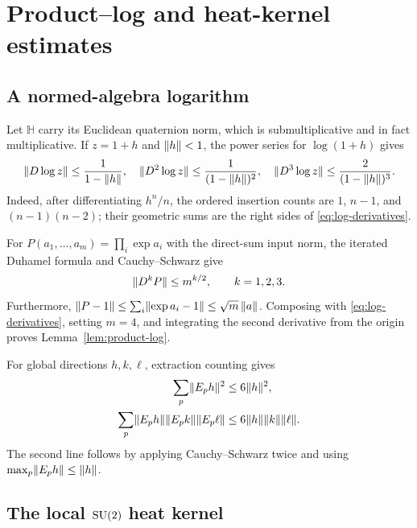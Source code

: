 \section{Product--log and heat-kernel estimates}\label{app:heat-kernel}

\subsection{A normed-algebra logarithm}

Let $\mathbb H$ carry its Euclidean quaternion norm, which is
submultiplicative and in fact multiplicative.  If $z=1+h$ and $\lVert h\rVert<1$,
the power series for $\log(1+h)$ gives
\begin{equation}\label{eq:log-derivatives}
 \lVert D\log z\rVert\le\frac1{1-\lVert h\rVert},\quad
 \lVert D^2\log z\rVert\le\frac1{(1-\lVert h\rVert)^2},\quad
 \lVert D^3\log z\rVert\le\frac2{(1-\lVert h\rVert)^3}.
\end{equation}
Indeed, after differentiating $h^n/n$, the ordered insertion counts are
$1$, $n-1$, and $(n-1)(n-2)$; their geometric sums are the right sides of
\eqref{eq:log-derivatives}.

For $P(a_1,\ldots,a_m)=\prod_i\exp a_i$ with the direct-sum input norm,
the iterated Duhamel formula and Cauchy--Schwarz give
\[
 \lVert D^kP\rVert\le m^{k/2},\qquad k=1,2,3.
\]
Furthermore,
$\lVert P-1\rVert\le\sum_i\lVert \exp a_i-1\rVert\le\sqrt m\,\lVert a\rVert$.
Composing with \eqref{eq:log-derivatives}, setting $m=4$, and integrating the
second derivative from the origin proves Lemma~\ref{lem:product-log}.

For global directions $h,k,\ell$, extraction counting gives
\begin{align*}
 \sum_p\lVert E_ph\rVert^2&\le6\lVert h\rVert^2,\\
 \sum_p\lVert E_ph\rVert\lVert E_pk\rVert\lVert E_p\ell\rVert
 &\le6\lVert h\rVert\lVert k\rVert\lVert \ell\rVert.
\end{align*}
The second line follows by applying Cauchy--Schwarz twice and using
$\max_p\lVert E_ph\rVert\le\lVert h\rVert$.

\subsection{The local $\mathrm{SU}(2)$ heat kernel}

